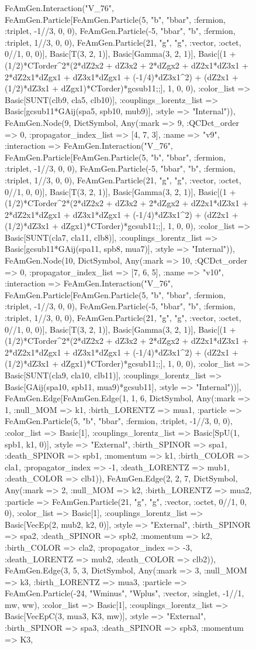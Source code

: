 \documentclass{revtex4}
\begin{document}
\begin{figure}[!htb]
\begin{center}
{FeAmGen.Interaction("V_76", FeAmGen.Particle[FeAmGen.Particle(5, "b", "bbar", :fermion, :triplet, -1//3, 0, 0), FeAmGen.Particle(-5, "bbar", "b", :fermion, :triplet, 1//3, 0, 0), FeAmGen.Particle(21, "g", "g", :vector, :octet, 0//1, 0, 0)], Basic[T(3, 2, 1)], Basic[Gamma(3, 2, 1)], Basic[(1 + (1/2)*CTorder^2*(2*dZ2x2 + dZ3x2 + 2*dZgx2 + dZ2x1*dZ3x1 + 2*dZ2x1*dZgx1 + dZ3x1*dZgx1 + (-1/4)*dZ3x1^2) + (dZ2x1 + (1/2)*dZ3x1 + dZgx1)*CTorder)*gcsub11;;], 1, 0, 0), :color_list => Basic[SUNT(clb9, cla5, clb10)], :couplings_lorentz_list => Basic[gcsub11*GAij(spa5, spb10, mub9)], :style => "Internal")), FeAmGen.Node(9, Dict{Symbol, Any}(:mark => 9, :QCDct_order => 0, :propagator_index_list => [4, 7, 3], :name => "v9", :interaction => FeAmGen.Interaction("V_76", FeAmGen.Particle[FeAmGen.Particle(5, "b", "bbar", :fermion, :triplet, -1//3, 0, 0), FeAmGen.Particle(-5, "bbar", "b", :fermion, :triplet, 1//3, 0, 0), FeAmGen.Particle(21, "g", "g", :vector, :octet, 0//1, 0, 0)], Basic[T(3, 2, 1)], Basic[Gamma(3, 2, 1)], Basic[(1 + (1/2)*CTorder^2*(2*dZ2x2 + dZ3x2 + 2*dZgx2 + dZ2x1*dZ3x1 + 2*dZ2x1*dZgx1 + dZ3x1*dZgx1 + (-1/4)*dZ3x1^2) + (dZ2x1 + (1/2)*dZ3x1 + dZgx1)*CTorder)*gcsub11;;], 1, 0, 0), :color_list => Basic[SUNT(cla7, cla11, clb8)], :couplings_lorentz_list => Basic[gcsub11*GAij(spa11, spb8, mua7)], :style => "Internal")), FeAmGen.Node(10, Dict{Symbol, Any}(:mark => 10, :QCDct_order => 0, :propagator_index_list => [7, 6, 5], :name => "v10", :interaction => FeAmGen.Interaction("V_76", FeAmGen.Particle[FeAmGen.Particle(5, "b", "bbar", :fermion, :triplet, -1//3, 0, 0), FeAmGen.Particle(-5, "bbar", "b", :fermion, :triplet, 1//3, 0, 0), FeAmGen.Particle(21, "g", "g", :vector, :octet, 0//1, 0, 0)], Basic[T(3, 2, 1)], Basic[Gamma(3, 2, 1)], Basic[(1 + (1/2)*CTorder^2*(2*dZ2x2 + dZ3x2 + 2*dZgx2 + dZ2x1*dZ3x1 + 2*dZ2x1*dZgx1 + dZ3x1*dZgx1 + (-1/4)*dZ3x1^2) + (dZ2x1 + (1/2)*dZ3x1 + dZgx1)*CTorder)*gcsub11;;], 1, 0, 0), :color_list => Basic[SUNT(cla9, cla10, clb11)], :couplings_lorentz_list => Basic[GAij(spa10, spb11, mua9)*gcsub11], :style => "Internal"))], FeAmGen.Edge[FeAmGen.Edge(1, 1, 6, Dict{Symbol, Any}(:mark => 1, :null_MOM => k1, :birth_LORENTZ => mua1, :particle => FeAmGen.Particle(5, "b", "bbar", :fermion, :triplet, -1//3, 0, 0), :color_list => Basic[1], :couplings_lorentz_list => Basic[SpU(1, spb1, k1, 0)], :style => "External", :birth_SPINOR => spa1, :death_SPINOR => spb1, :momentum => k1, :birth_COLOR => cla1, :propagator_index => -1, :death_LORENTZ => mub1, :death_COLOR => clb1)), FeAmGen.Edge(2, 2, 7, Dict{Symbol, Any}(:mark => 2, :null_MOM => k2, :birth_LORENTZ => mua2, :particle => FeAmGen.Particle(21, "g", "g", :vector, :octet, 0//1, 0, 0), :color_list => Basic[1], :couplings_lorentz_list => Basic[VecEp(2, mub2, k2, 0)], :style => "External", :birth_SPINOR => spa2, :death_SPINOR => spb2, :momentum => k2, :birth_COLOR => cla2, :propagator_index => -3, :death_LORENTZ => mub2, :death_COLOR => clb2)), FeAmGen.Edge(3, 5, 3, Dict{Symbol, Any}(:mark => 3, :null_MOM => k3, :birth_LORENTZ => mua3, :particle => FeAmGen.Particle(-24, "Wminus", "Wplus", :vector, :singlet, -1//1, mw, ww), :color_list => Basic[1], :couplings_lorentz_list => Basic[VecEpC(3, mua3, K3, mw)], :style => "External", :birth_SPINOR => spa3, :death_SPINOR => spb3, :momentum => K3, }
\end{center}
\end{figure}
\end{document}
